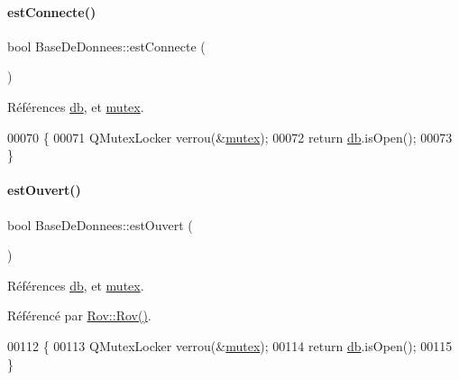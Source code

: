 \paragraph{\texorpdfstring{est\+Connecte()}{estConnecte()}}
{\footnotesize\ttfamily bool Base\+De\+Donnees\+::est\+Connecte (\begin{DoxyParamCaption}{ }\end{DoxyParamCaption})}



Références \hyperlink{class_base_de_donnees_a3e738dcf443370c46a541677ab619f06}{db}, et \hyperlink{class_base_de_donnees_aa1b4696fac87a740f914aa73739086f2}{mutex}.


\begin{DoxyCode}
00070 \{
00071     QMutexLocker verrou(&\hyperlink{class_base_de_donnees_aa1b4696fac87a740f914aa73739086f2}{mutex});
00072     \textcolor{keywordflow}{return} \hyperlink{class_base_de_donnees_a3e738dcf443370c46a541677ab619f06}{db}.isOpen();
00073 \}
\end{DoxyCode}
\mbox{\label{class_base_de_donnees_af9ac332082ffd0dd35e412cefabe5e9c}} 
\paragraph{\texorpdfstring{est\+Ouvert()}{estOuvert()}}
{\footnotesize\ttfamily bool Base\+De\+Donnees\+::est\+Ouvert (\begin{DoxyParamCaption}{ }\end{DoxyParamCaption})}



Références \hyperlink{class_base_de_donnees_a3e738dcf443370c46a541677ab619f06}{db}, et \hyperlink{class_base_de_donnees_aa1b4696fac87a740f914aa73739086f2}{mutex}.



Référencé par \hyperlink{class_rov_a5dddd3bd156c134848078296087d090c}{Rov\+::\+Rov()}.


\begin{DoxyCode}
00112 \{
00113     QMutexLocker verrou(&\hyperlink{class_base_de_donnees_aa1b4696fac87a740f914aa73739086f2}{mutex});
00114     \textcolor{keywordflow}{return} \hyperlink{class_base_de_donnees_a3e738dcf443370c46a541677ab619f06}{db}.isOpen();
00115 \}
\end{DoxyCode}
\mbox{\label{class_base_de_donnees_aa8de5f8f8bb17edc43f5c0ee33712081}} 
